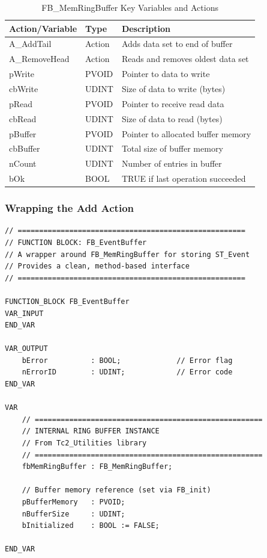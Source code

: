 \documentclass[11pt,a4paper]{article}
\begin{document}
\begin{table}[h]
\centering
\begin{tabular}{@{}llp{6cm}@{}}
\toprule
\textbf{Action/Variable} & \textbf{Type} & \textbf{Description} \\
\midrule
A\_AddTail & Action & Adds data set to end of buffer \\
A\_RemoveHead & Action & Reads and removes oldest data set \\
pWrite & PVOID & Pointer to data to write \\
cbWrite & UDINT & Size of data to write (bytes) \\
pRead & PVOID & Pointer to receive read data \\
cbRead & UDINT & Size of data to read (bytes) \\
pBuffer & PVOID & Pointer to allocated buffer memory \\
cbBuffer & UDINT & Total size of buffer memory \\
nCount & UDINT & Number of entries in buffer \\
bOk & BOOL & TRUE if last operation succeeded \\
\bottomrule
\end{tabular}
\caption{FB\_MemRingBuffer Key Variables and Actions}
\end{table}

\subsubsection*{Wrapping the Add Action}

\begin{lstlisting}
// =====================================================
// FUNCTION BLOCK: FB_EventBuffer
// A wrapper around FB_MemRingBuffer for storing ST_Event
// Provides a clean, method-based interface
// =====================================================

FUNCTION_BLOCK FB_EventBuffer
VAR_INPUT
END_VAR

VAR_OUTPUT
    bError          : BOOL;             // Error flag
    nErrorID        : UDINT;            // Error code
END_VAR

VAR
    // =====================================================
    // INTERNAL RING BUFFER INSTANCE
    // From Tc2_Utilities library
    // =====================================================
    fbMemRingBuffer : FB_MemRingBuffer;
    
    // Buffer memory reference (set via FB_init)
    pBufferMemory   : PVOID;
    nBufferSize     : UDINT;
    bInitialized    : BOOL := FALSE;
    
END_VAR
\end{lstlisting}
\end{document}
